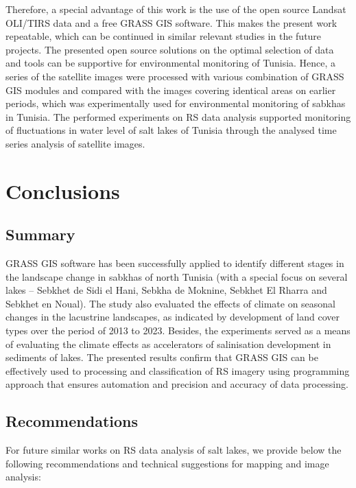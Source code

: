 \documentclass[land,article,submit,pdftex,moreauthors]{Definitions/mdpi}
\begin{document}
Therefore, a special advantage of this work is the use of the open source Landsat OLI/TIRS data and a free GRASS GIS software. This makes the present work repeatable, which can be continued in similar relevant studies in the future projects. The presented open source solutions on the optimal selection of data and tools can be supportive for environmental monitoring  of Tunisia. Hence, a series of the satellite images were processed with various combination of GRASS GIS modules and compared with the images covering identical areas on earlier periods, which was experimentally used for environmental monitoring of sabkhas in Tunisia. The performed experiments on RS data analysis supported monitoring of fluctuations in water level of salt lakes of Tunisia through the analysed time series analysis of satellite images. 

\section{Conclusions}

\subsection{Summary}

GRASS GIS software has been successfully applied to identify different stages in the landscape change in sabkhas of north Tunisia (with a special focus on several lakes -- Sebkhet de Sidi el Hani, Sebkha de Moknine, Sebkhet El Rharra and Sebkhet en Noual). The study also evaluated the effects of climate on seasonal changes in the lacustrine landscapes, as indicated by development of land cover types over the period of 2013 to 2023. Besides, the experiments served as a means of evaluating the climate effects as accelerators of salinisation development in sediments of lakes. The presented results confirm that GRASS GIS can be effectively used to processing and classification of RS imagery using programming approach that ensures automation and precision and accuracy of data processing. 

\subsection{Recommendations}

For future similar works on RS data analysis of salt lakes, we provide below the following recommendations and technical suggestions for mapping and image analysis:
\end{document}
